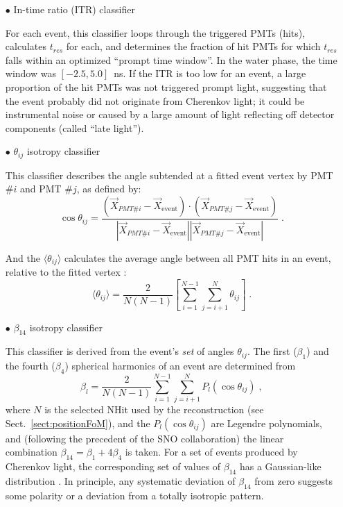 \begin{itemize}
	\item[$\bullet$] In-time ratio (ITR) classifier
	
	For each event, this classifier loops through the triggered PMTs (hits), calculates $t_{res}$ for each, and determines the fraction of hit PMTs for which $t_{res}$ falls within an optimized ``prompt time window''. In the water phase, the time window was $[-2.5,5.0]$~ns. If the ITR is too low for an event, a large proportion of the hit PMTs was not triggered prompt light, suggesting that the event probably did not originate from Cherenkov light; it could be instrumental noise or caused by a large amount of light reflecting off detector components (called ``late light''). 
	
	\item[$\bullet$] $\theta_{ij}$ isotropy classifier

	This classifier describes the angle subtended at a fitted event vertex by PMT $\#i$ and PMT $\#j$, as defined by:
	\begin{equation}
	\cos\theta_{ij}=\frac{(\vec{X}_{PMT\#i}- \vec{X}_\mathrm{event})\cdot (\vec{X}_{PMT\#j}- \vec{X}_\mathrm{event})}{|\vec{X}_{PMT\#i}- \vec{X}_\mathrm{event}||\vec{X}_{PMT\#j}- \vec{X}_\mathrm{event}|}\;.
	\end{equation}
	
	And the $\langle \theta_{ij} \rangle$ calculates the average angle between all PMT hits in an event,
	relative to the fitted vertex \cite{dunmore2004separation}:
	\begin{equation}
     \langle \theta_{ij} \rangle = \frac{2}{N(N-1)}\left[\sum_{i=1}^{N-1}\sum_{j=i+1}^N\theta_{ij}\right]\;.
	\end{equation}
	
	\item[$\bullet$] $\beta_{14}$ isotropy classifier
	
	This classifier is derived from the event's {\em set} of angles $\theta_{ij}$. The first ($\beta_1$) and the fourth ($\beta_4$) spherical harmonics of an event are determined from
	\begin{equation}
	\beta_l = \frac{2}{N(N-1)}\sum_{i=1}^{N-1}\sum_{j=i+1}^N P_l(\cos\theta_{ij}) \; ,
	\end{equation}
	where $N$ is the selected NHit used by the reconstruction (see Sect.~\ref{sect:positionFoM}), and the $P_l(\cos\theta_{ij})$ are Legendre polynomials, and (following the precedent of the SNO collaboration) the linear combination $\beta_{14}=\beta_1+4\beta_4$ is taken. For a set of events produced by Cherenkov light, the corresponding set of values of $\beta_{14}$ has a Gaussian-like distribution \cite{dunmore2004separation}. In principle, any systematic deviation of $\beta_{14}$ from zero suggests some polarity or a deviation from a totally isotropic pattern.
	
\end{itemize}

